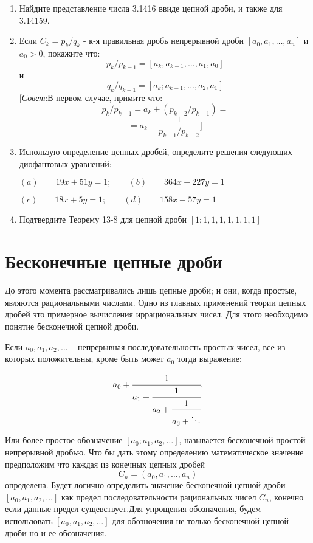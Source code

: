 \documentclass[11pt]{article}
\begin{document}
\begin{enumerate}
	\item Найдите представление числа 3.1416 ввиде цепной дроби, и также для 3.14159.
	
	\item Если $C_k=p_k/q_k$ - к-я правильная дробь непрерывной дроби $[a_0,a_1,\dots,a_n]$ и $a_0>0$, покажите что:
	\[p_k/p_{k-1}=[a_k,a_{k-1},\dots,a_1,a_0]\]
	и
	\[q_k/q_{k-1}=[a_k;a_{k-1},\dots,a_2,a_1]\]
	[\textit{Совет}:В первом случае, примите что:
	\[p_k/p_{k-1}=a_k+(p_{k-2}/p_{k-1})=\]
	\[=a_k+\frac{1}{p_{k-1}/p_{k-2}}]\]
	\item Использую определение цепных дробей, определите решения следующих диофантовых уравнений:
	
	$(a)\qquad19x+51y=1;\qquad(b)\qquad364x+227y=1$
	
		$(c)\qquad18x+5y=1;\qquad(d)\qquad158x-57y=1$
		\\
\item Подтвердите Теорему 13-8 для цепной дроби $[1;1,1,1,1,1,1,1]$ 
\end{enumerate}

		
\section{Бесконечные цепные дроби}

До этого момента рассматривались лишь цепные дроби; и они, когда простые, являются рациональными числами. Одно из главных применений теории цепных дробей это примерное вычисления иррациональных чисел. Для этого необходимо понятие бесконечной цепной дроби.
		
Если $a_0,a_1,a_2,\dots$ -- непрерывная последовательность простых чисел, все из которых положительны, кроме быть может $a_0$ тогда выражение: 
		
		\[a_0+\cfrac{1}{a_1+\cfrac{1}{a_2+\cfrac{1}{a_3+\ddots}}},\]
		
Или более простое обозначение $[a_0;a_1,a_2,\dots]$, называется бесконечной простой непрерывной дробью. Что бы дать этому определению математическое значение предположим что каждая из конечных цепных дробей
$$C_n=(a_0,a_1,\dots,a_n)$$
определена. Будет логично определить значение бесконечной цепной дроби $[a_0,a_1,a_2,\dots]$ как предел последовательности рациональных чисел $C_n$, конечно если данные предел сущевствует.Для упрощения обозначения, будем использовать $[a_0,a_1,a_2,\dots]$ для обозночения не только бесконечной цепной дроби но и ее обозначения.
\end{document}
